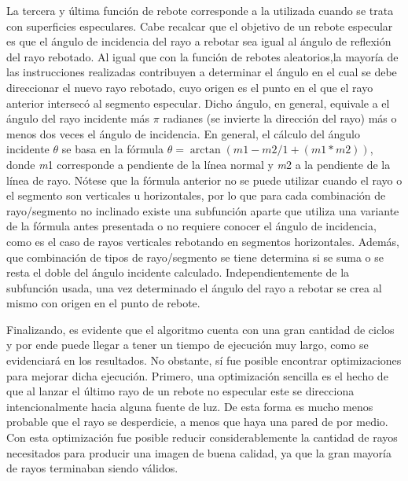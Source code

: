 \documentclass[conference]{IEEEtran}
\begin{document}
La tercera y última función de rebote corresponde a la utilizada cuando se trata con superficies especulares. Cabe recalcar que el objetivo de un rebote especular es que el ángulo de incidencia del rayo a rebotar sea igual al ángulo de reflexión del rayo rebotado. Al igual que con la función de rebotes aleatorios,la mayoría de las instrucciones realizadas contribuyen a determinar el ángulo en el cual se debe direccionar el nuevo rayo rebotado, cuyo origen es el punto en el que el rayo anterior intersecó al segmento especular. Dicho ángulo, en general, equivale a el ángulo del rayo incidente más $\pi$ radianes (se invierte la dirección del rayo) más o menos dos veces el ángulo de incidencia. En general, el cálculo del ángulo incidente $\theta$ se basa en la fórmula \(\theta = \arctan{(m1 - m2 / 1 + (m1 * m2))}\), donde \textit{m}1 corresponde a pendiente de la línea normal y \textit{m}2 a la pendiente de la línea de rayo. Nótese que la fórmula anterior no se puede utilizar cuando el rayo o el segmento son verticales u horizontales, por lo que para cada combinación de rayo/segmento no inclinado existe una subfunción aparte que utiliza una variante de la fórmula antes presentada o no requiere conocer el ángulo de incidencia, como es el caso de rayos verticales rebotando en segmentos horizontales. Además, que combinación de tipos de rayo/segmento se tiene determina si se suma o se resta el doble del ángulo incidente calculado. Independientemente de la subfunción usada, una vez determinado el ángulo del rayo a rebotar se crea al mismo con origen en el punto de rebote.

Finalizando, es evidente que el algoritmo cuenta con una gran cantidad de ciclos y por ende puede llegar a tener un tiempo de ejecución muy largo, como se evidenciará en los resultados. No obstante, sí fue posible encontrar optimizaciones para mejorar dicha ejecución. Primero, una optimización sencilla es el hecho de que al lanzar el último rayo de un rebote no especular este se direcciona intencionalmente hacia alguna fuente de luz. De esta forma es mucho menos probable que el rayo se desperdicie, a menos que haya una pared de por medio. Con esta optimización fue posible reducir considerablemente la cantidad de rayos necesitados para producir una imagen de buena calidad, ya que la gran mayoría de rayos terminaban siendo válidos. 
\end{document}
